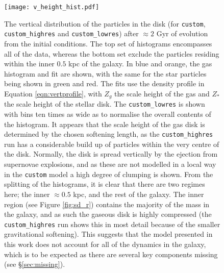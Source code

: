 \begin{figure}
    \centering
    \texttt{[image: v\_height\_hist.pdf]}
    \caption{The vertical distribution of the particles in the disk (for {\tt custom}, {\tt custom\_highres} and {\tt custom\_lowres}) after $\approx 2$ Gyr of evolution from the initial conditions. The top set of histograms encompasses all of the data, whereas the bottom set exclude the particles residing within the inner $0.5$ kpc of the galaxy. In blue and orange, the gas histogram and fit are shown, with the same for the star particles being shown in green and red. The fits use the density profile in Equation \ref{eqn:vertprofile}, with $Z_g$ the scale height of the gas and $Z_*$ the scale height of the stellar disk. The {\tt custom\_lowres} is shown with bins ten times as wide as to normalise the overall contents of the histogram. It appears that the scale height of the gas disk is determined by the chosen softening length, as the {\tt custom\_highres} run has a considerable build up of particles within the very centre of the disk. Normally, the disk is spread vertically by the ejection from supernovae explosions, and as these are not modelled in a local way in the {\tt custom} model a high degree of clumping is shown. From the splitting of the histograms, it is clear that there are two regimes here; the inner $\approx 0.5$ kpc, and the rest of the galaxy. The inner region (see Figure \ref{fig:sd_r}) contains the majority of the mass in the galaxy, and as such the gaseous disk is highly compressed (the {\tt custom\_highres} run shows this in most detail because of the smaller gravitational softening). This suggests that the model presented in this work does not account for all of the dynamics in the galaxy, which is to be expected as there are several key components missing (see \S \ref{sec:missing}).}
    \label{fig:vheighthist}
\end{figure}
